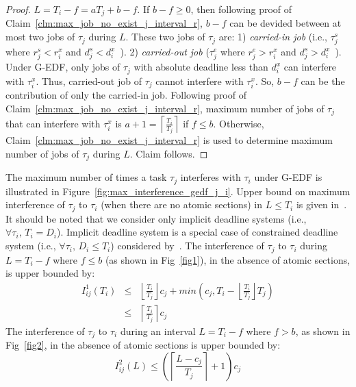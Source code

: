 %
\begin{proof}
%
$L=T_{i}-f=aT_{j}+b-f$. If $b-f\ge0$, then following proof of Claim~\ref{clm:max_job_no_exist_j_interval_r},
$b-f$ can be devided between at most two jobs of $\tau_{j}$ during
$L$. These two jobs of $\tau_{j}$ are: 1) \textit{carried-in job}
(i.e., $\tau_{j}^{s}$ where $r_{j}^{s}<r_{i}^{x}$ and $d_{j}^{s}<d_{i}^{x}$~\cite{key-2}). 2) \textit{carried-out job} ({$\tau_{j}^{e}$} where $r_{j}^{e}>r_{i}^{x}$ and $d_{j}^{s}>d_{i}^{x}$~\cite{key-2}).
Under G-EDF, only jobs of $\tau_{j}$ with absolute deadline less
than $d_{i}^{x}$ can interfere with $\tau_{i}^{x}$. Thus, carried-out
job of $\tau_{j}$ cannot interfere with $\tau_{i}^{x}$. So, $b-f$
can be the contribution of only the carried-in job. Following proof
of Claim~\ref{clm:max_job_no_exist_j_interval_r}, maximum number
of jobs of $\tau_{j}$ that can interfere with $\tau_{i}^{x}$ is $a+1=\left\lceil \frac{T_{i}}{T_{j}}\right\rceil $
if $f\le b$. Otherwise, Claim~\ref{clm:max_job_no_exist_j_interval_r}
is used to determine maximum number of jobs of $\tau_{j}$ during
$L$. Claim follows.
%
\end{proof}
%
The maximum number of times a task $\tau_{j}$ interferes with $\tau_{i}$ under G-EDF is illustrated in Figure~\ref{fig:max_interference_gedf_j_i}. 
Upper bound on maximum interference of $\tau_{j}$ to $\tau_{i}$ (when there are no atomic sections) in $L \le T_{i}$ is given in~\cite{key-2}. It should be noted that we consider only implicit deadline systems (i.e., $\forall \tau_i,\,T_i=D_i$). Implicit deadline system is a special case of constrained deadline system (i.e., $\forall \tau_i,\,D_i \le T_i$) considered by~\cite{key-2}. The interference of $\tau_j$ to $\tau_i$ during $L=T_i - f$ where $f \le b$ (as shown in Fig~\ref{fig1}), in the absence of atomic sections, is upper bounded by:
\begin{eqnarray}
I^1_{ij}\left(T_{i}\right) & \le & \left\lfloor\frac{T_{i}}{T_{j}}\right\rfloor c_{j}+min\left(c_{j},T_{i}-\left\lfloor\frac{T_{i}}{T_{j}}\right\rfloor T_{j}\right)\nonumber \\
 & \le & \left\lceil\frac{T_{i}}{T_{j}}\right\rceil c_{j}\label{eq11}\end{eqnarray}
%
The interference of $\tau_j$ to $\tau_i$ during an interval $L=T_i-f$ where $f > b$, as shown in Fig~\ref{fig2}, in the absence of atomic sections is upper bounded by:
\begin{equation}
I^2_{ij}\left(L\right)\le \left(\left\lceil\frac{L-c_{j}}{T_{j}}\right\rceil +1\right)c_{j}
\label{eq12}\end{equation}
